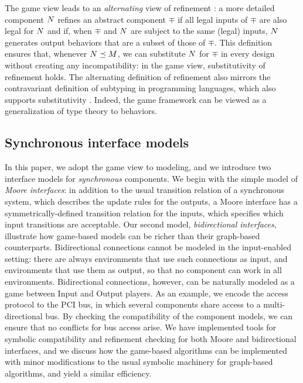 The game view leads to an {\em alternating\/} view of refinement
\cite{CONCUR98AHKV}: a more detailed component $N$ refines an
abstract component $\mp$ if all legal inputs of $\mp$
are also legal for $N$ and if, when $\mp$ and $N$ are subject to
the same (legal) inputs, $N$ generates output behaviors that are a
subset of those of $\mp$. 
This definition ensures that, whenever $N \preceq M$, we can
substitute $N$ for $\mp$ in every design without creating any
incompatibility: in the game view, substitutivity of refinement
holds. 
The alternating definition of refinement also mirrors the contravariant 
definition of subtyping in programming languages, which also supports 
substitutivity \cite{Mitchell96}.
Indeed, the game framework can be viewed as a generalization of type theory to
behaviors. 


\subsection{Synchronous interface models} 

In this paper, we adopt the game view to modeling, and we
introduce two interface models for {\em synchronous} components.
We begin with the simple model of {\em Moore interfaces\/}:
in addition to the usual transition relation of a
synchronous system, which describes the update rules for the outputs, a
Moore interface has a symmetrically-defined transition relation for the
inputs, which specifies which input transitions are acceptable.
Our second model, {\em bidirectional interfaces},
illustrate how game-based models can
be richer than their graph-based counterparts.
Bidirectional connections cannot be modeled in the input-enabled
setting: there are always environments that use such connections as
input, and environments that use them as output, so that no component
can work in all environments.  
Bidirectional connections, however, can be naturally modeled as a game
between Input and Output players.
As an example, we encode the access protocol to the PCI bus, in
which several components share access to a multi-directional bus. 
By checking the compatibility of the component models, we can ensure
that no conflicts for bus access arise. 
We have implemented tools for symbolic compatibility and
refinement checking for both Moore and bidirectional interfaces, and we 
discuss how the game-based algorithms can be implemented with minor
modifications to the usual symbolic machinery for graph-based algorithms, 
and yield a similar efficiency. 

